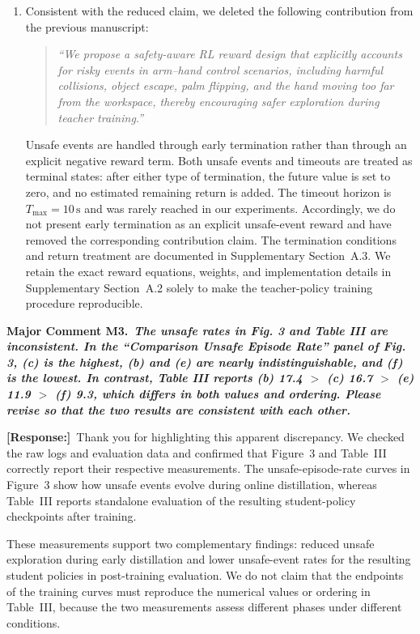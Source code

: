 \documentclass[11pt]{article}
\newcommand{\response}{\par\smallskip\noindent\textcolor{responseblue}{\textbf{[Response:]}}\ }
\newcounter{reviewcomment}
\newcommand{\reviewcommentlabel}[2]{%
  \refstepcounter{reviewcomment}
  \par\medskip
  \noindent\colorbox{draftgray}{%
    \parbox{\dimexpr\linewidth-2\fboxsep\relax}{%
      \textbf{#1.}\ \textbf{\itshape #2}%
    }%
  }\par\smallskip
}
\begin{document}
\begin{enumerate}[label=(\arabic*),leftmargin=2em,itemsep=6pt,topsep=3pt]
  \item Consistent with the reduced claim, we deleted the following
  contribution from the previous manuscript:
  \begin{quote}
  \itshape
  ``We propose a safety-aware RL reward design that explicitly accounts for
  risky events in arm--hand control scenarios, including harmful collisions,
  object escape, palm flipping, and the hand moving too far from the workspace,
  thereby encouraging safer exploration during teacher training.''
  \end{quote}
  Unsafe events are handled through early termination rather than through an
  explicit negative reward term. Both unsafe events and timeouts are treated as
  terminal states: after either type of termination, the future value is set to
  zero, and no estimated remaining return is added. The timeout horizon is
  $T_{\max}=10\,\mathrm{s}$ and was rarely reached in our experiments.
  Accordingly, we do not present early termination as an explicit unsafe-event
  reward and have removed the corresponding contribution claim. The termination
  conditions and return treatment are documented in Supplementary
  Section~A.3. We retain the exact reward
  equations, weights, and implementation details in Supplementary
  Section~A.2 solely to make the teacher-policy training procedure reproducible.
\end{enumerate}

\reviewcommentlabel{Major Comment M3}{The unsafe rates in Fig. 3 and Table III
are inconsistent. In the ``Comparison Unsafe Episode Rate'' panel of Fig. 3,
(c) is the highest, (b) and (e) are nearly indistinguishable, and (f) is the
lowest. In contrast, Table III reports (b) 17.4 $>$ (c) 16.7 $>$ (e) 11.9 $>$
(f) 9.3, which differs in both values and ordering. Please revise so that the
two results are consistent with each other.}

\response Thank you for highlighting this apparent discrepancy. We checked the
raw logs and evaluation data and confirmed that Figure~3 and Table~III
correctly report their respective measurements. The unsafe-episode-rate
curves in Figure~3 show how unsafe events evolve during online distillation,
whereas Table~III reports standalone evaluation of the resulting
student-policy checkpoints after training.

These measurements support two complementary findings: reduced unsafe
exploration during early distillation and lower unsafe-event rates for the
resulting student policies in post-training evaluation. We do not claim that
the endpoints of the training curves must reproduce the numerical values or
ordering in Table~III, because the two measurements assess different phases
under different conditions.
\end{document}
